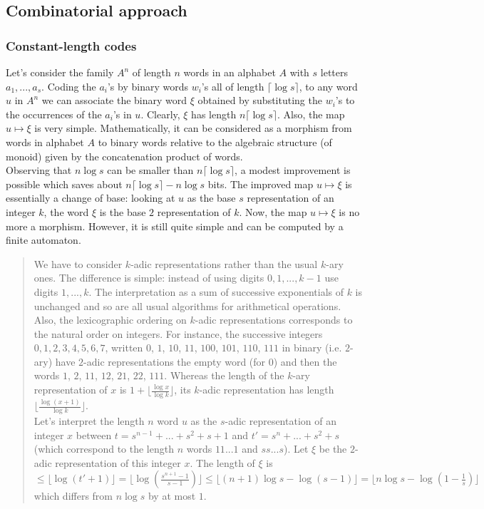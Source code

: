 \subsection{Combinatorial approach}\label{s:combinatorial}
\subsubsection{Constant-length codes}\label{sss:constantlength}
Let's consider the family $A^n$ of length $n$ words in an alphabet
$A$ with $s$ letters $a_1,...,a_s$.
Coding the $a_i$'s by binary words $w_i$'s all of length
$\lceil\log s\rceil$, to any word $u$ in $A^n$ we can associate
the binary word $\xi$ obtained by substituting the $w_i$'s to the
occurrences of the $a_i$'s in $u$.
Clearly, $\xi$ has length $n\lceil\log s\rceil$.
Also, the map $u\mapsto\xi$ is very simple. Mathematically,
it can be considered as a morphism from words in alphabet $A$
to binary words relative to the algebraic structure (of monoid)
given by the concatenation product of words.
\medskip\\
Observing that $n\log s$ can be smaller than $n \lceil\log s\rceil$,
a modest improvement is possible which saves about
$n\lceil \log s\rceil - n\log s$ bits.
The improved map $u\mapsto\xi$ is essentially a change of base:
looking at $u$ as the base $s$ representation of an integer
$k$, the word $\xi$ is the base $2$ representation of $k$.
Now, the map $u\mapsto\xi$ is no more a morphism.
However, it is still quite simple and can be computed
by a finite automaton.
{\small\begin{quote}
We have to consider $k$-adic representations rather than the usual
$k$-ary ones.
The difference is simple: instead of using digits $0,1,...,k-1$
use digits $1,...,k$. The interpretation as a sum of successive
exponentials of $k$ is unchanged and so are all usual algorithms
for arithmetical operations.
Also, the lexicographic ordering on $k$-adic representations
corresponds to the natural order on integers.
For instance, the successive integers $0,1,2,3,4,5,6,7$,
written $0$, $1$, $10$, $11$, $100$, $101$, $110$, $111$ in binary
(i.e. $2$-ary) have $2$-adic representations the empty word (for $0$)
and then the words $1$, $2$, $11$, $12$, $21$, $22$, $111$.
Whereas the length of the $k$-ary representation of $x$ is
$1+\lfloor\frac{\log x}{\log k}\rfloor$, its $k$-adic representation
has length $\lfloor\frac{\log (x+1)}{\log k}\rfloor$.
\\
Let's interpret the length $n$ word $u$ as the $s$-adic
representation of an integer $x$ between $t=s^{n-1}+...+s^2+s+1$
and $t'=s^n+...+s^2+s$
(which correspond to the length $n$ words $11...1$ and $ss...s$).
Let $\xi$ be the $2$-adic representation of this integer $x$.
The length of $\xi$ is
$\leq \lfloor\log (t'+1)\rfloor
   =  \lfloor \log(\frac{s^{n+1}-1}{s-1})\rfloor
 \leq  \lfloor (n+1)\log s - \log(s-1)\rfloor
 =  \lfloor n\log s - \log(1-\frac{1}{s})\rfloor$
which differs from $n\log s$ by at most $1$.
\end{quote}}
